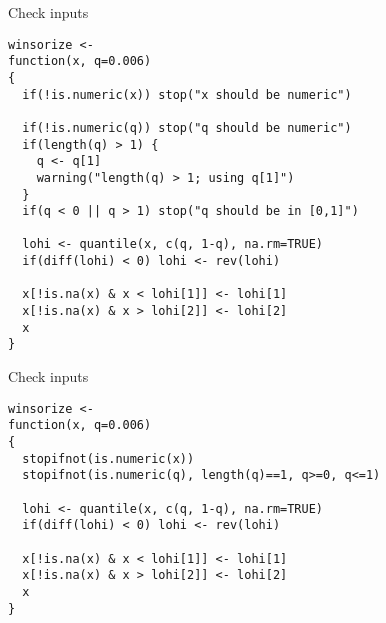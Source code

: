 \documentclass[12pt,t]{beamer}
\begin{document}
\begin{frame}[c,fragile]{Check inputs}


\begin{lstlisting}
winsorize <-
function(x, q=0.006)
{
  if(!is.numeric(x)) stop("x should be numeric")

  if(!is.numeric(q)) stop("q should be numeric")
  if(length(q) > 1) {
    q <- q[1]
    warning("length(q) > 1; using q[1]")
  }
  if(q < 0 || q > 1) stop("q should be in [0,1]")

  lohi <- quantile(x, c(q, 1-q), na.rm=TRUE)
  if(diff(lohi) < 0) lohi <- rev(lohi)

  x[!is.na(x) & x < lohi[1]] <- lohi[1]
  x[!is.na(x) & x > lohi[2]] <- lohi[2]
  x
}
\end{lstlisting}


\end{frame}




\begin{frame}[c,fragile]{Check inputs}


\begin{lstlisting}
winsorize <-
function(x, q=0.006)
{
  stopifnot(is.numeric(x))
  stopifnot(is.numeric(q), length(q)==1, q>=0, q<=1)

  lohi <- quantile(x, c(q, 1-q), na.rm=TRUE)
  if(diff(lohi) < 0) lohi <- rev(lohi)

  x[!is.na(x) & x < lohi[1]] <- lohi[1]
  x[!is.na(x) & x > lohi[2]] <- lohi[2]
  x
}
\end{lstlisting}


\end{frame}
\end{document}
